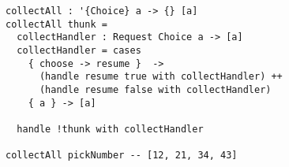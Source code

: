 \begin{algorithm}

\begin{verbatim}
collectAll : '{Choice} a -> {} [a]
collectAll thunk = 
  collectHandler : Request Choice a -> [a]
  collectHandler = cases
    { choose -> resume }  ->
      (handle resume true with collectHandler) ++
      (handle resume false with collectHandler)
    { a } -> [a]

  handle !thunk with collectHandler
  
collectAll pickNumber -- [12, 21, 34, 43]
\end{verbatim}

\caption{Effect handler for Choice that collects all possible results. %
\label{alg-eff:choice-collect}}
\end{algorithm}